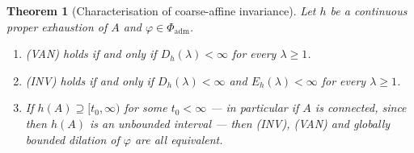 \documentclass[10pt,a4paper]{amsart}
\newtheorem{theorem}{Theorem}
\begin{document}
\begin{theorem}[Characterisation of coarse-affine invariance]\label{thm:coarse-stability}
Let $h$ be a continuous proper exhaustion of $A$ and $\varphi\in\Phi_{\mathrm{adm}}$.
\begin{enumerate}
\item[(a)] \textup{(VAN)} holds if and only if $D_h(\lambda)<\infty$ for every $\lambda\ge1$.
\item[(b)] \textup{(INV)} holds if and only if $D_h(\lambda)<\infty$ and
$E_h(\lambda)<\infty$ for every $\lambda\ge1$.
\item[(c)] If $h(A)\supseteq[t_0,\infty)$ for some $t_0<\infty$ --- in particular if $A$ is
connected, since then $h(A)$ is an unbounded interval --- then \textup{(INV)},
\textup{(VAN)} and globally bounded dilation of $\varphi$ are all equivalent.
\end{enumerate}
\end{theorem}
\end{document}
